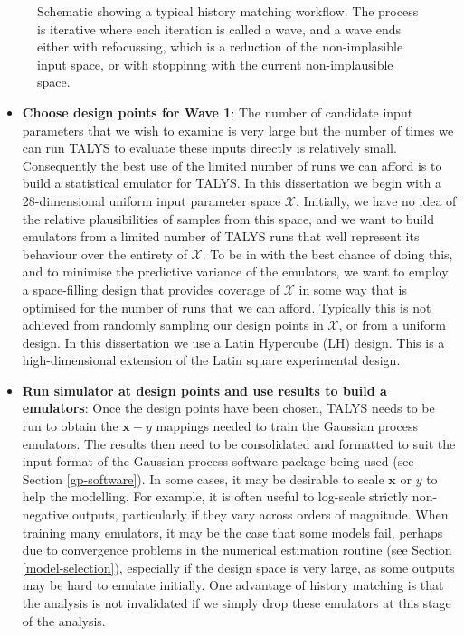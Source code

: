 \documentclass[
  12pt,
  a4paper,
  twoside]{book}
\begin{document}
\begin{figure}[H]
{}

\caption{Schematic showing a typical history matching workflow. The process is iterative where each iteration is called a wave, and a wave ends either with refocussing, which is a reduction of the non-implasible input space, or with stoppinng with the current non-implausible space.}\label{fig:hm-workflow}
\end{figure}

\begin{itemize}
\item
  \textbf{Choose design points for Wave 1}: The number of candidate input parameters that we wish to examine is very large but the number of times we can run TALYS to evaluate these inputs directly is relatively small. Consequently the best use of the limited number of runs we can afford is to build a statistical emulator for TALYS. In this dissertation we begin with a 28-dimensional uniform input parameter space \(\mathcal{X}\). Initially, we have no idea of the relative plausibilities of samples from this space, and we want to build emulators from a limited number of TALYS runs that well represent its behaviour over the entirety of \(\mathcal{X}\). To be in with the best chance of doing this, and to minimise the predictive variance of the emulators, we want to employ a space-filling design that provides coverage of \(\mathcal{X}\) in some way that is optimised for the number of runs that we can afford. Typically this is not achieved from randomly sampling our design points in \(\mathcal{X}\), or from a uniform design. In this dissertation we use a Latin Hypercube (LH) design. This is a high-dimensional extension of the Latin square experimental design.
\item
  \textbf{Run simulator at design points and use results to build a emulators}: Once the design points have been chosen, TALYS needs to be run to obtain the \(\mathbf{x}-y\) mappings needed to train the Gaussian process emulators. The results then need to be consolidated and formatted to suit the input format of the Gaussian process software package being used (see Section \ref{gp-software}). In some cases, it may be desirable to scale \(\mathbf{x}\) or \(y\) to help the modelling. For example, it is often useful to log-scale strictly non-negative outputs, particularly if they vary across orders of magnitude. When training many emulators, it may be the case that some models fail, perhaps due to convergence problems in the numerical estimation routine (see Section \ref{model-selection}), especially if the design space is very large, as some outputs may be hard to emulate initially. One advantage of history matching is that the analysis is not invalidated if we simply drop these emulators at this stage of the analysis.

\end{itemize}
\end{document}
